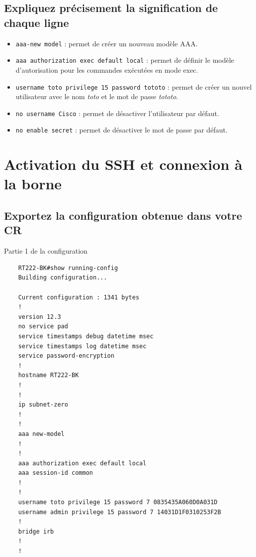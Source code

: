 \documentclass[12pt, a4paper]{article}
\begin{document}
    \subsection{Expliquez précisement la signification de chaque ligne}
    \begin{itemize}
        \item \texttt{aaa-new model} : permet de créer un nouveau modèle AAA.
        \item \texttt{aaa authorization exec default local} : permet de définir le modèle d'autorisation pour les commandes exécutées en mode exec.
        \item \texttt{username toto privilege 15 password tototo} : permet de créer un nouvel utilisateur avec le nom \textit{toto} et le mot de passe \textit{tototo}.
        \item \texttt{no username Cisco} : permet de désactiver l'utilisateur par défaut.
        \item \texttt{no enable secret} : permet de désactiver le mot de passe par défaut.
    \end{itemize}

\section{Activation du SSH et connexion à la borne}
    \subsection{Exportez la configuration obtenue dans votre CR}
    \begin{listing}[H]
        \caption{Partie 1 de la configuration }
        \label{lst:conf}
        \begin{verbatim}
    RT222-BK#show running-config
    Building configuration...

    Current configuration : 1341 bytes
    !
    version 12.3
    no service pad
    service timestamps debug datetime msec
    service timestamps log datetime msec
    service password-encryption
    !
    hostname RT222-BK
    !
    !
    ip subnet-zero
    !
    !
    aaa new-model
    !
    !
    aaa authorization exec default local
    aaa session-id common
    !
    !
    username toto privilege 15 password 7 0835435A060D0A031D
    username admin privilege 15 password 7 14031D1F0310253F2B
    !
    bridge irb
    !
    !
        \end{verbatim}
    \end{listing}
\end{document}
